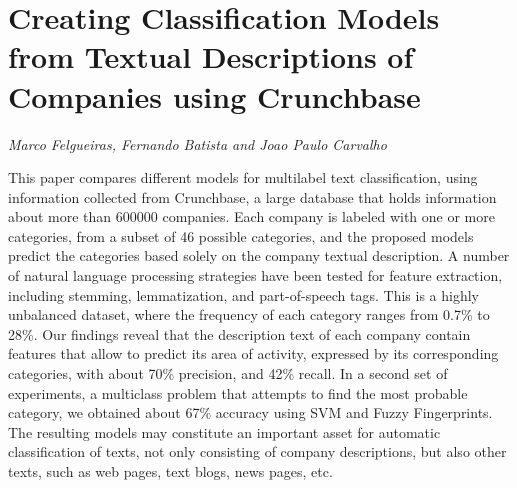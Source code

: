 \documentclass[../booklet.tex]{subfiles}
\begin{document}
\section[Creating Classification Models from Textual Descriptions of Companies using Crunchbase. {\it Marco Felgueiras, Fernando Batista and Joao Paulo Carvalho}]{Creating Classification Models from Textual Descriptions of Companies using Crunchbase}
  

\begin{center}
  {\it Marco Felgueiras, Fernando Batista and Joao Paulo Carvalho}
\end{center}

\vskip 0.8cm


This paper compares different models for multilabel text classification, using information collected from Crunchbase, a large data\-base that holds information about more than 600000 companies. Each company is labeled with one or more categories, from a subset of 46 possible categories, and the proposed models predict the categories based solely on the company textual description. A number of natural language processing strategies have been tested for feature extraction, including stemming, lemmatization, and part-of-speech tags. This is a highly unbalanced dataset, where the frequency of each category ranges from 0.7\% to 28\%. Our findings reveal that the description text of each company contain features that allow to predict its area of activity, expressed by its corresponding categories, with about 70\% precision, and 42\% recall. In a second set of experiments, a multiclass problem that attempts to find the most probable category, we obtained about 67\% accuracy using SVM and Fuzzy Fingerprints. The resulting models may constitute an important asset for automatic classification of texts, not only consisting of company descriptions, but also other texts, such as web pages, text blogs, news pages, etc.

\end{document}
